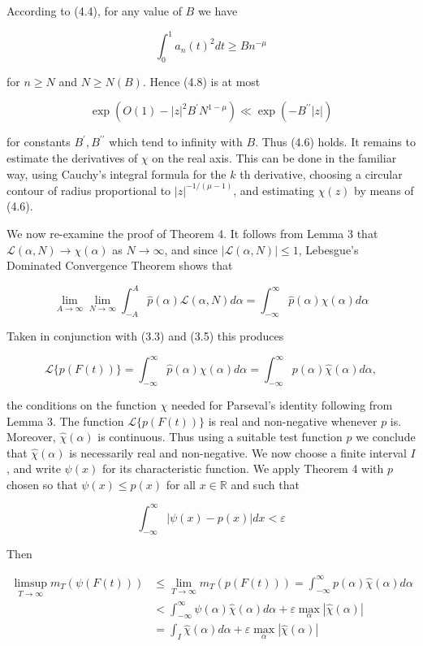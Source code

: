 \documentclass[10pt]{article}
\begin{document}
According to (4.4), for any value of $B$ we have

$$
\int_{0}^{1} a_{n}(t)^{2} d t \geq B n^{-\mu}
$$

for $n \geq N$ and $N \geq N(B)$. Hence (4.8) is at most

$$
\exp \left(O(1)-|z|^{2} B^{\prime} N^{1-\mu}\right) \ll \exp \left(-B^{\prime \prime}|z|\right)
$$

for constants $B^{\prime}, B^{\prime \prime}$ which tend to infinity with $B$. Thus (4.6) holds. It remains to estimate the derivatives of $\chi$ on the real axis. This can be done in the familiar way, using Cauchy's integral formula for the $k$ th derivative, choosing a circular contour of radius proportional to $|z|^{-1 /(\mu-1)}$, and estimating $\chi(z)$ by means of (4.6).

We now re-examine the proof of Theorem 4. It follows from Lemma 3 that $\mathcal{L}(\alpha, N) \rightarrow \chi(\alpha)$ as $N \rightarrow \infty$, and since $|\mathcal{L}(\alpha, N)| \leq 1$, Lebesgue's Dominated Convergence Theorem shows that

$$
\lim _{A \rightarrow \infty} \lim _{N \rightarrow \infty} \int_{-A}^{A} \widehat{p}(\alpha) \mathcal{L}(\alpha, N) d \alpha=\int_{-\infty}^{\infty} \widehat{p}(\alpha) \chi(\alpha) d \alpha
$$

Taken in conjunction with (3.3) and (3.5) this produces

$$
\mathcal{L}\{p(F(t))\}=\int_{-\infty}^{\infty} \widehat{p}(\alpha) \chi(\alpha) d \alpha=\int_{-\infty}^{\infty} p(\alpha) \widehat{\chi}(\alpha) d \alpha,
$$

the conditions on the function $\chi$ needed for Parseval's identity following from Lemma 3. The function $\mathcal{L}\{p(F(t))\}$ is real and non-negative whenever $p$ is. Moreover, $\widehat{\chi}(\alpha)$ is continuous. Thus using a suitable test function $p$ we conclude that $\widehat{\chi}(\alpha)$ is necessarily real and non-negative. We now choose a finite interval $I$, and write $\psi(x)$ for its characteristic function. We apply Theorem 4 with $p$ chosen so that $\psi(x) \leq p(x)$ for all $x \in \mathbb{R}$ and such that

$$
\int_{-\infty}^{\infty}|\psi(x)-p(x)| d x<\varepsilon
$$

Then

$$
\begin{aligned}
\limsup _{T \rightarrow \infty} m_{T}(\psi(F(t))) & \leq \lim _{T \rightarrow \infty} m_{T}(p(F(t)))=\int_{-\infty}^{\infty} p(\alpha) \widehat{\chi}(\alpha) d \alpha \\
& <\int_{-\infty}^{\infty} \psi(\alpha) \widehat{\chi}(\alpha) d \alpha+\varepsilon \max _{\alpha}|\widehat{\chi}(\alpha)| \\
& =\int_{I} \widehat{\chi}(\alpha) d \alpha+\varepsilon \max _{\alpha}|\widehat{\chi}(\alpha)|
\end{aligned}
$$
\end{document}
